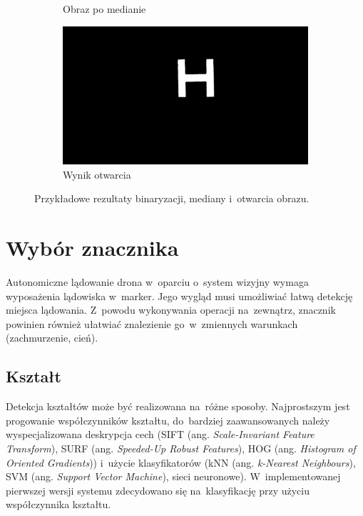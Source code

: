 \begin{figure}
\begin{subfigure}{0.4\textwidth}
		\caption{Obraz po medianie}
		\label{fig:median_1}
	\end{subfigure}
	\begin{subfigure}{0.4\textwidth}
		\centering
		\includegraphics[width=\textwidth]{opened.jpg}
		\caption{Wynik otwarcia}
		\label{fig:opened_1}
	\end{subfigure}
	\caption{Przykładowe rezultaty binaryzacji, mediany i~otwarcia obrazu.}
	\label{fig:operacje}
\end{figure}


\section{Wybór znacznika} 
\label{sec:wybor_znacznika}

Autonomiczne lądowanie drona w~oparciu o~system wizyjny wymaga wyposażenia lądowiska w~marker. 
Jego wygląd musi umożliwiać łatwą detekcję miejsca lądowania. 
Z~powodu wykonywania operacji na~zewnątrz, znacznik powinien również ułatwiać znalezienie go~w~zmiennych warunkach (zachmurzenie, cień).

\subsection{Kształt}
\label{subsec:ksztalt} 
Detekcja kształtów może być realizowana na~różne sposoby. 
Najprostszym jest progowanie współczynników kształtu, do~bardziej zaawansowanych należy wyspecjalizowana deskrypcja cech (SIFT (ang. \textit{Scale-Invariant Feature Transform}), SURF (ang. \textit{Speeded-Up Robust Features}), HOG (ang. \textit{Histogram of Oriented Gradients})) i~użycie klasyfikatorów (kNN (ang. \textit{k-Nearest Neighbours}), SVM (ang. \textit{Support Vector Machine}), sieci neuronowe).
W~implementowanej pierwszej wersji systemu zdecydowano się na~klasyfikację przy użyciu współczynnika kształtu.

